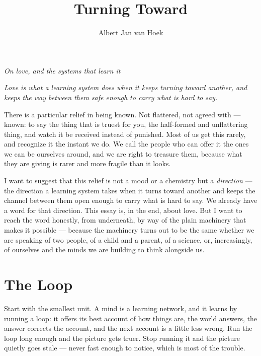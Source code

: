 \documentclass[12pt, a4paper]{article}
\title{\Large\textbf{Turning Toward}}
\author{Albert Jan van Hoek}
\date{}
\begin{document}
\maketitle

\begin{center}
\textit{On love, and the systems that learn it}
\end{center}

\vspace{0.5cm}

\epigraph{\textit{Love is what a learning system does when it keeps turning toward another, and keeps the way between them safe enough to carry what is hard to say.}}{}

\vspace{1cm}

There is a particular relief in being known. Not flattered, not agreed with — known: to say the thing that is truest for you, the half-formed and unflattering thing, and watch it be received instead of punished. Most of us get this rarely, and recognize it the instant we do. We call the people who can offer it the ones we can be ourselves around, and we are right to treasure them, because what they are giving is rarer and more fragile than it looks.

I want to suggest that this relief is not a mood or a chemistry but a \textit{direction} — the direction a learning system takes when it turns toward another and keeps the channel between them open enough to carry what is hard to say. We already have a word for that direction. This essay is, in the end, about love. But I want to reach the word honestly, from underneath, by way of the plain machinery that makes it possible — because the machinery turns out to be the same whether we are speaking of two people, of a child and a parent, of a science, or, increasingly, of ourselves and the minds we are building to think alongside us.

\section*{The Loop}
Start with the smallest unit. A mind is a learning network, and it learns by running a loop: it offers its best account of how things are, the world answers, the answer corrects the account, and the next account is a little less wrong. Run the loop long enough and the picture gets truer. Stop running it and the picture quietly goes stale — never fast enough to notice, which is most of the trouble.
\end{document}
